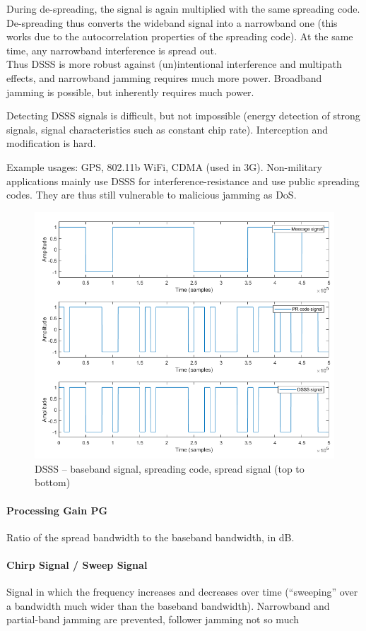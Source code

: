 During de-spreading, the signal is again multiplied with the same spreading code.
De-spreading thus converts the wideband signal into a narrowband one (this works due to the autocorrelation properties of the spreading code).
At the same time, any narrowband interference is spread out.
\\
Thus DSSS is more robust against (un)intentional interference and multipath effects, and narrowband jamming requires much more power.
Broadband jamming is possible, but inherently requires much power.

Detecting DSSS signals is difficult, but not impossible (energy detection of strong signals, signal characteristics such as constant chip rate).
Interception and modification is hard.

Example usages: GPS, 802.11b WiFi, CDMA (used in 3G).
Non-military applications mainly use DSSS for interference-resistance and use public spreading codes.
They are thus still vulnerable to malicious jamming as DoS.

\begin{figure}
	\centering
	\includegraphics[scale=0.6]{images/2-dsss.png}
	\caption{DSSS -- baseband signal, spreading code, spread signal (top to bottom)}
	\label{fig:dsss}
\end{figure}

\paragraph{Processing Gain PG}
Ratio of the spread bandwidth to the baseband bandwidth, in dB.


\paragraph{Chirp Signal / Sweep Signal}
Signal in which the frequency increases and decreases over time (``sweeping'' over a bandwidth much wider than the baseband bandwidth).
Narrowband and partial-band jamming are prevented, follower jamming not so much
